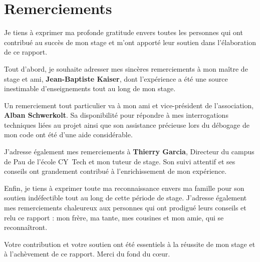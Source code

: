 \section*{Remerciements}

Je tiens à exprimer ma profonde gratitude envers toutes les personnes qui ont contribué au succès de mon stage et m'ont apporté leur soutien dans l'élaboration de ce rapport.

\medskip

Tout d'abord, je souhaite adresser mes sincères remerciements à mon maître de stage et ami, \textbf{Jean-Baptiste Kaiser}, dont l'expérience a été une source inestimable d'enseignements tout au long de mon stage.

\medskip

Un remerciement tout particulier va à mon ami et vice-président de l'association, \textbf{Alban Schwerkolt}. Sa disponibilité pour répondre à mes interrogations techniques liées au projet ainsi que son assistance précieuse lors du débogage de mon code ont été d'une aide considérable.

\medskip

J'adresse également mes remerciements à \textbf{Thierry Garcia}, Directeur du campus de Pau de l'école CY~Tech et mon tuteur de stage. Son suivi attentif et ses conseils ont grandement contribué à l'enrichissement de mon expérience.

\medskip

Enfin, je tiens à exprimer toute ma reconnaissance envers ma famille pour son soutien indéfectible tout au long de cette période de stage. J'adresse également mes remerciements chaleureux aux personnes qui ont prodigué leurs conseils et relu ce rapport : mon frère, ma tante, mes cousines et mon amie, qui se reconnaîtront.

\bigskip

Votre contribution et votre soutien ont été essentiels à la réussite de mon stage et à l'achèvement de ce rapport. Merci du fond du cœur.